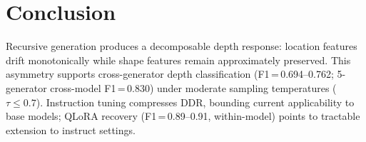 \section{Conclusion}
\label{sec:conclusion}

 Recursive generation produces a decomposable depth response: location features drift monotonically while shape features remain approximately preserved. This asymmetry supports cross-generator depth classification (F1\,=\,0.694--0.762; 5-generator cross-model F1\,=\,0.830) under moderate sampling temperatures ($\tau \leq 0.7$).
Instruction tuning compresses DDR, bounding current applicability to base models; QLoRA recovery (F1\,=\,0.89--0.91, within-model) points to tractable extension to instruct settings.

